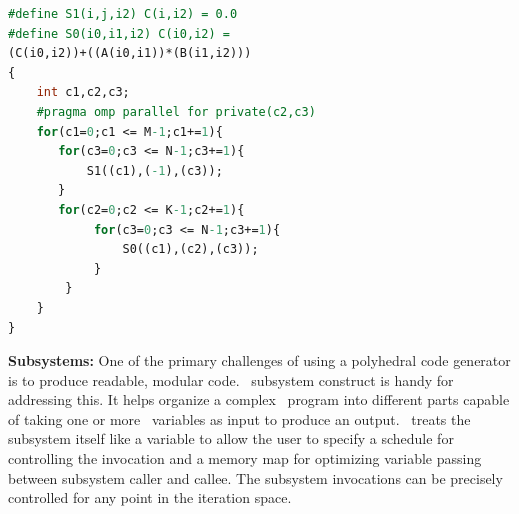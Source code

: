 \newpage
\begin{lstlisting}[label={listing:alpha_code_gen}, language=Caml, caption=Generated code - Matrix multiplication]
#define S1(i,j,i2) C(i,i2) = 0.0
#define S0(i0,i1,i2) C(i0,i2) = 
(C(i0,i2))+((A(i0,i1))*(B(i1,i2)))
{
    int c1,c2,c3;
    #pragma omp parallel for private(c2,c3)
    for(c1=0;c1 <= M-1;c1+=1){
	   for(c3=0;c3 <= N-1;c3+=1){
	       S1((c1),(-1),(c3));
	   }
       for(c2=0;c2 <= K-1;c2+=1){
            for(c3=0;c3 <= N-1;c3+=1){
                S0((c1),(c2),(c3));
            }
        }
    }
}

\end{lstlisting}


\textbf{Subsystems:} One of the primary challenges of using a polyhedral code generator is to produce readable, modular code. \alphaz\ subsystem construct is handy for addressing this. It helps organize a complex \alfa\ program into different parts capable of taking one or more \alfa\ variables as input to produce an output. \alphaz\ treats the subsystem itself like a variable to allow the user to specify a schedule for controlling the invocation and a memory map for optimizing variable passing between subsystem caller and callee. The subsystem invocations can be precisely controlled for any point in the iteration space.




